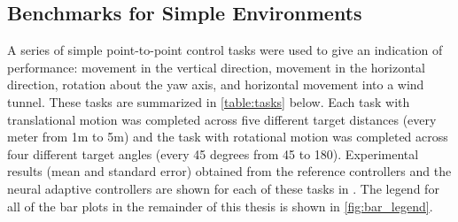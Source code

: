 \documentclass[letterpaper,12pt,titlepage,oneside,final]{book}
\begin{document}
\subsection{Benchmarks for Simple Environments}

A series of simple point-to-point control tasks were used to give an indication of performance:  movement in the vertical direction, movement in the horizontal direction, rotation about the yaw axis, and horizontal movement into a wind tunnel. %
These tasks are summarized in \autoref{table:tasks} below.
Each task with translational motion was completed across five different target distances (every meter from 1m to 5m) and the task with rotational motion was completed across four different target angles (every 45 degrees from 45{\degree} to 180{\degree}).
Experimental results (mean and standard error) obtained from the reference controllers and the neural adaptive controllers are shown for each of these tasks in .
The legend for all of the bar plots in the remainder of this thesis is shown in \autoref{fig:bar_legend}.
 

\end{document}
